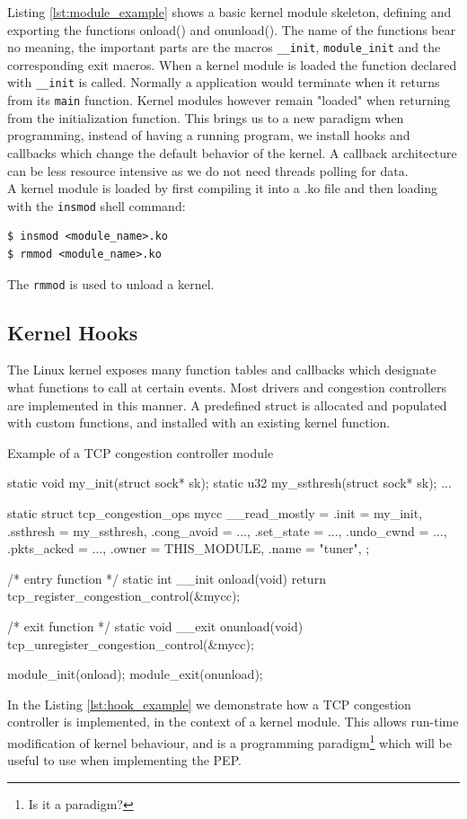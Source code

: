 \documentclass[a4paper,english, 11pt]{report}
\begin{document}
Listing \ref{lst:module_example} shows a basic kernel module skeleton, defining and exporting the functions onload() and onunload(). The name of the functions bear no meaning, the important parts are the macros \verb|__init|, \verb|module_init| and the corresponding exit macros\cite{lkm}. When a kernel module is loaded the function declared with \verb|__init| is called. Normally a application would terminate when it returns from its \verb|main| function. Kernel modules however remain "loaded" when returning from the initialization function. This brings us to a new paradigm when programming, instead of having a running program, we install hooks and callbacks which change the default behavior of the kernel. A callback architecture can be less resource intensive as we do not need threads polling for data.\\

A kernel module is loaded by first compiling it into a .ko file and then loading with the \verb|insmod| shell command:
\begin{verbatim}
$ insmod <module_name>.ko
$ rmmod <module_name>.ko
\end{verbatim}
The \verb|rmmod| is used to unload a kernel. 

\subsection{Kernel Hooks}
The Linux kernel exposes many function tables and callbacks which designate what functions to call at certain events. Most drivers and congestion controllers are implemented in this manner. A predefined struct is allocated and populated with custom functions, and installed with an existing kernel function.

\begin{autonumlstlisting}[label=lst:hook_example]{Example of a TCP congestion controller module}

static void my_init(struct sock* sk);
static u32 my_ssthresh(struct sock* sk);
...

static struct tcp_congestion_ops mycc __read_mostly = {
  .init           = my_init,
  .ssthresh       = my_ssthresh,
  .cong_avoid     = ...,
  .set_state      = ...,
  .undo_cwnd      = ...,
  .pkts_acked     = ...,
  .owner          = THIS_MODULE,
  .name           = "tuner",
};

/* entry function */
static int __init onload(void) {
    return tcp_register_congestion_control(&mycc);
}

/* exit function */
static void __exit onunload(void) {
    tcp_unregister_congestion_control(&mycc);
}

module_init(onload);
module_exit(onunload);
\end{autonumlstlisting}
In the Listing \ref{lst:hook_example} we demonstrate how a TCP congestion controller is implemented, in the context of a kernel module. This allows run-time modification of kernel behaviour, and is a programming paradigm\footnote{Is it a paradigm?} which will be useful to use when implementing the PEP.
\end{document}
